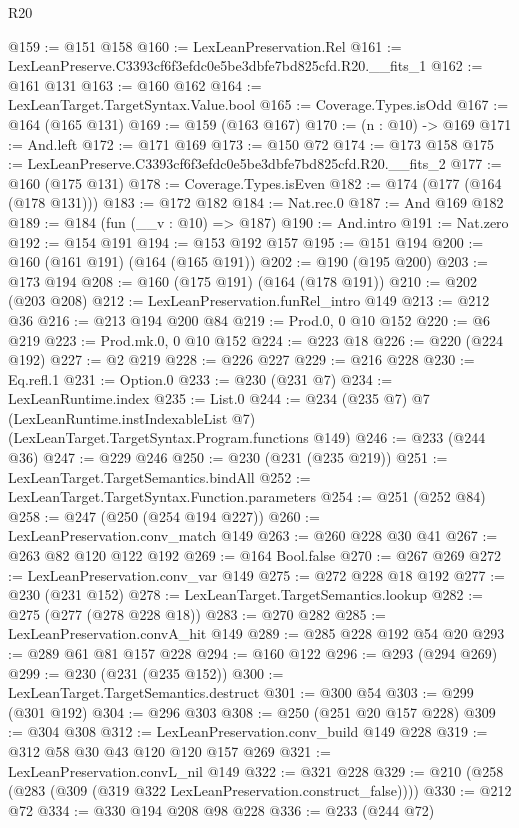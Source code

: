 \begin{lexlean}{R20}
\begin{coremodule}
@159 := @151 @158
@160 := LexLeanPreservation.Rel
@161 := LexLeanPreserve.C3393cf6f3efdc0e5be3dbfe7bd825cfd.R20.__fits_1
@162 := @161 @131
@163 := @160 @162
@164 := LexLeanTarget.TargetSyntax.Value.bool
@165 := Coverage.Types.isOdd
@167 := @164 (@165 @131)
@169 := @159 (@163 @167)
@170 := (n : @10) -> @169
@171 := And.left
@172 := @171 @169
@173 := @150 @72
@174 := @173 @158
@175 := LexLeanPreserve.C3393cf6f3efdc0e5be3dbfe7bd825cfd.R20.__fits_2
@177 := @160 (@175 @131)
@178 := Coverage.Types.isEven
@182 := @174 (@177 (@164 (@178 @131)))
@183 := @172 @182
@184 := Nat.rec.{0}
@187 := And @169 @182
@189 := @184 (fun (__v : @10) => @187)
@190 := And.intro
@191 := Nat.zero
@192 := @154 @191
@194 := @153 @192 @157
@195 := @151 @194
@200 := @160 (@161 @191) (@164 (@165 @191))
@202 := @190 (@195 @200)
@203 := @173 @194
@208 := @160 (@175 @191) (@164 (@178 @191))
@210 := @202 (@203 @208)
@212 := LexLeanPreservation.funRel_intro @149
@213 := @212 @36
@216 := @213 @194 @200 @84
@219 := Prod.{0, 0} @10 @152
@220 := @6 @219
@223 := Prod.mk.{0, 0} @10 @152
@224 := @223 @18
@226 := @220 (@224 @192)
@227 := @2 @219
@228 := @226 @227
@229 := @216 @228
@230 := Eq.refl.{1}
@231 := Option.{0}
@233 := @230 (@231 @7)
@234 := LexLeanRuntime.index
@235 := List.{0}
@244 := @234
    (@235 @7)
    @7
    (LexLeanRuntime.instIndexableList @7)
    (LexLeanTarget.TargetSyntax.Program.functions @149)
@246 := @233 (@244 @36)
@247 := @229 @246
@250 := @230 (@231 (@235 @219))
@251 := LexLeanTarget.TargetSemantics.bindAll
@252 := LexLeanTarget.TargetSyntax.Function.parameters
@254 := @251 (@252 @84)
@258 := @247 (@250 (@254 @194 @227))
@260 := LexLeanPreservation.conv_match @149
@263 := @260 @228 @30 @41
@267 := @263 @82 @120 @122 @192
@269 := @164 Bool.false
@270 := @267 @269
@272 := LexLeanPreservation.conv_var @149
@275 := @272 @228 @18 @192
@277 := @230 (@231 @152)
@278 := LexLeanTarget.TargetSemantics.lookup
@282 := @275 (@277 (@278 @228 @18))
@283 := @270 @282
@285 := LexLeanPreservation.convA_hit @149
@289 := @285 @228 @192 @54 @20
@293 := @289 @61 @81 @157 @228
@294 := @160 @122
@296 := @293 (@294 @269)
@299 := @230 (@231 (@235 @152))
@300 := LexLeanTarget.TargetSemantics.destruct
@301 := @300 @54
@303 := @299 (@301 @192)
@304 := @296 @303
@308 := @250 (@251 @20 @157 @228)
@309 := @304 @308
@312 := LexLeanPreservation.conv_build @149 @228
@319 := @312 @58 @30 @43 @120 @120 @157 @269
@321 := LexLeanPreservation.convL_nil @149
@322 := @321 @228
@329 := @210 (@258 (@283 (@309 (@319 @322 LexLeanPreservation.construct_false))))
@330 := @212 @72
@334 := @330 @194 @208 @98 @228
@336 := @233 (@244 @72)

\end{coremodule}
\end{lexlean}
